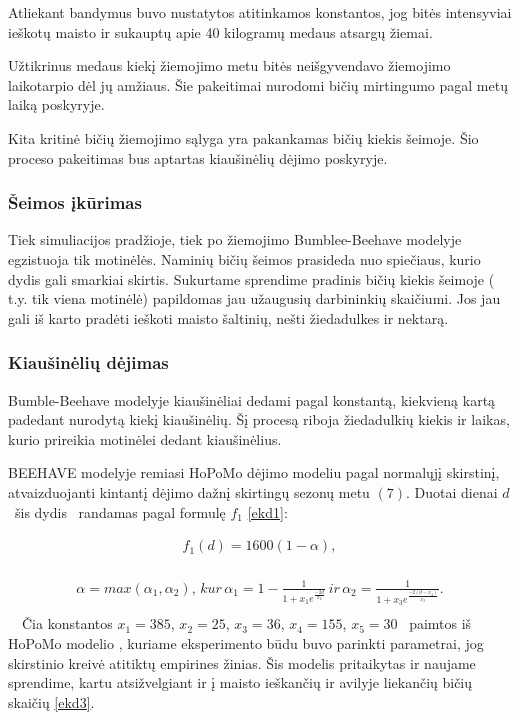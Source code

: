 \documentclass{VUMIFKompMagistrinis}
\begin{document}
Atliekant bandymus buvo nustatytos atitinkamos konstantos, jog bitės intensyviai ieškotų maisto ir sukauptų apie 40 kilogramų medaus atsargų žiemai.

Užtikrinus medaus kiekį žiemojimo metu bitės neišgyvendavo žiemojimo laikotarpio dėl jų amžiaus. Šie pakeitimai nurodomi bičių mirtingumo pagal metų laiką poskyryje.

Kita kritinė bičių žiemojimo sąlyga yra pakankamas bičių kiekis šeimoje. Šio proceso pakeitimas bus aptartas kiaušinėlių dėjimo poskyryje.


\subsubsection{Šeimos \k{i}k\=urimas}
Tiek simuliacijos pradžioje, tiek po žiemojimo Bumblee-Beehave modelyje egzistuoja tik motinėlės. Naminių bičių šeimos prasideda nuo spiečiaus, kurio dydis gali smarkiai skirtis. Sukurtame sprendime pradinis bičių kiekis šeimoje ( t.y. tik viena motinėlė) papildomas jau užaugusių darbininkių skaičiumi. Jos jau gali iš karto pradėti ieškoti maisto šaltinių, nešti žiedadulkes ir nektarą. 


\subsubsection{Kiau\v{s}in\.eli\k{u} d\.ejimas}
Bumble-Beehave modelyje kiaušinėliai dedami pagal konstantą, kiekvieną kartą padedant nurodytą kiekį kiaušinėlių. Šį procesą riboja žiedadulkių kiekis ir laikas, kurio prireikia motinėlei dedant kiaušinėlius.

BEEHAVE modelyje remiasi HoPoMo d\.ejimo modeliu pagal normal\k{u}j\k{i} skirstin\k{i}, atvaizduojanti kintant\k{i} d\.ejimo da\v{z}n\k{i} skirting\k{u} sezon\k{u} metu  $(7)$. Duotai dienai  $d$ \ \v{s}is dydis \ randamas pagal formul\k{e}  $f_1$ \eqref{ekd1}:

\begin{equation}
\label{ekd1}
\begin{matrix}f_1(d)=1600(1-\alpha ),\\\end{matrix}
\end{equation}

\bigskip

\begin{equation}
\label{ekd2}
\begin{matrix}\alpha =max(\alpha _{1},\alpha _{2}),\,kur\,\alpha _1=1-\frac 1{1+x_1e^{\frac{-2d}{x_2}}}\,ir\,\alpha _2=\frac 1{1+x_3e^{\frac{-2(d-x_4)}{x_3}}}.\\\end{matrix}
\end{equation}
\ \ \v{C}ia konstantos  $x_1=385$,  $x_2=25$,  $x_3=36$,  $x_4=155$,  $x_5=30$ \ paimtos i\v{s} HoPoMo modelio \cite{ScC07}, kuriame eksperimento b\=udu buvo parinkti parametrai, jog skirstinio kreiv\.e atitikt\k{u} empirines \v{z}inias. \v{S}is modelis pritaikytas ir naujame sprendime, kartu atsi\v{z}velgiant ir \k{i} maisto ie\v{s}kan\v{c}i\k{u} ir avilyje liekan\v{c}i\k{u} bi\v{c}i\k{u} skai\v{c}i\k{u} \eqref{ekd3}.
\end{document}
